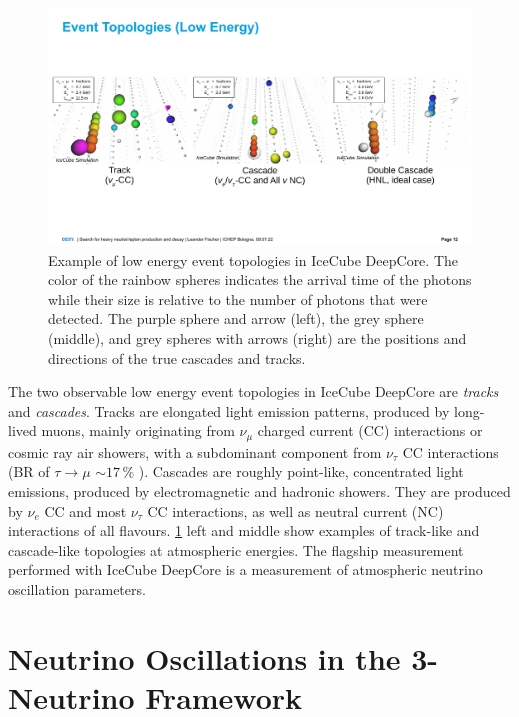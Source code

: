 \documentclass[a4paper,11pt]{article}
\begin{document}
\begin{figure}[h!]
    \includegraphics[trim = 0cm 4.5cm 0cm 5.5cm, clip, width=1.0\linewidth]{figures/event_views_all_three.png}
    \caption{Example of low energy event topologies in IceCube DeepCore. The color of the rainbow spheres indicates the arrival time of the photons while their size is relative to the number of photons that were detected. The purple sphere and arrow (left), the grey sphere (middle), and grey spheres with arrows (right) are the positions and directions of the true cascades and tracks.}
    \label{fig:low_energy_eventviews}
  \end{figure}

The two observable low energy event topologies in IceCube DeepCore are \textit{tracks} and \textit{cascades}. Tracks are elongated light emission patterns, produced by long-lived muons, mainly originating from $\nu_{\mu}$ charged current (CC) interactions or cosmic ray air showers, with a subdominant component from $\nu_{\tau}$ CC interactions (BR of $\tau\rightarrow\mu$ $\sim17\,\%$ \cite{PhysRevD.98.030001}). Cascades are roughly point-like, concentrated light emissions, produced by electromagnetic and hadronic showers. They are produced by $\nu_{e}$ CC and most $\nu_{\tau}$ CC interactions, as well as neutral current (NC) interactions of all flavours. \cref{fig:low_energy_eventviews} left and middle show examples of track-like and cascade-like topologies at atmospheric energies. The flagship measurement performed with IceCube DeepCore is a measurement of atmospheric neutrino oscillation parameters.


\vspace{-0.5cm}
\section{Neutrino Oscillations in the 3-Neutrino Framework} \label{sec:neutrino_oscillations}
\end{document}
